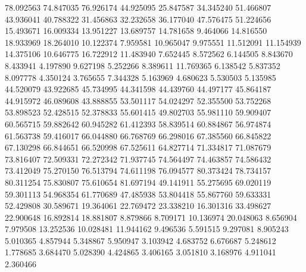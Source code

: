78.092563
74.847035
76.926174
44.925095
25.847587
34.345240
51.466807
43.936041
40.788322
31.456863
32.232658
36.177040
47.576475
51.224656
15.493671
16.009334
13.951227
13.689757
14.781658
9.464066
14.816550
18.933969
18.264010
10.122374
7.959581
10.965047
9.975551
11.512091
11.154939
14.375106
10.646775
16.722912
11.483940
7.652445
8.572562
6.144505
8.843670
8.433941
4.197890
9.627198
5.252266
8.389611
11.769365
6.138542
5.837352
8.097778
4.350124
3.765655
7.344328
5.163969
4.680623
5.530503
5.135985
44.520079
43.922685
45.734995
44.341598
44.439760
44.497177
45.864187
44.915972
46.089608
43.888855
53.501117
54.024297
52.355500
53.752268
53.898523
52.428515
52.378833
55.601415
49.802703
55.981110
59.909407
60.565715
59.882642
60.945282
61.412393
58.839514
60.884867
56.974874
61.563738
59.416017
66.044880
66.768769
66.298016
67.385560
66.845822
67.130298
66.844651
66.520998
67.525611
64.827714
71.334817
71.087679
73.816407
72.509331
72.272342
71.937745
74.564497
74.463857
74.586432
73.412049
75.270150
76.513794
74.611198
76.094577
80.373424
78.734157
80.311254
75.830807
75.610654
81.697194
49.141911
55.275695
69.020119
59.301113
54.968354
61.770689
47.485938
53.804418
55.867760
59.633331
52.429808
30.589671
19.364061
22.769472
23.338210
16.301316
33.498627
22.900648
16.892814
18.881807
8.879866
8.709171
10.136974
20.048063
8.656904
7.979508
13.252536
10.028481
11.944162
9.496536
5.591515
9.297081
8.905243
5.010365
4.857944
5.348867
5.950947
3.103942
4.683752
6.676687
5.248612
1.778685
3.684470
5.028390
4.424865
3.406165
3.051810
3.168976
4.911041
2.360466

